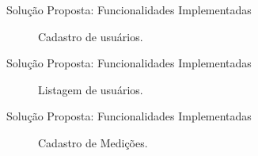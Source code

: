 \begin{frame}{Solução Proposta: Funcionalidades Implementadas}
\begin{figure}[h!]
\centering
{}
\caption{Cadastro de usuários.}
\end{figure}
\end{frame}

\begin{frame}{Solução Proposta: Funcionalidades Implementadas}
\begin{figure}[h!]
\centering
{}
\caption{Listagem de usuários.}
\end{figure}
\end{frame}


\begin{frame}{Solução Proposta: Funcionalidades Implementadas}
\begin{figure}[h!]
\centering
{}
\caption{Cadastro de Medições.}
\end{figure}
\end{frame}

